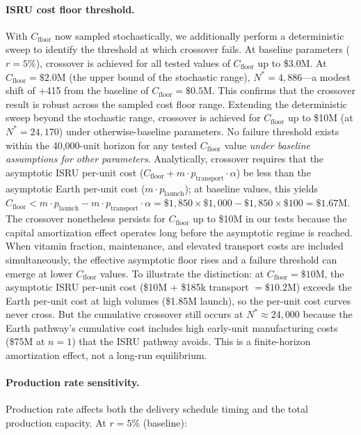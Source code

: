 \documentclass[preprint,12pt]{elsarticle}
\begin{document}
\paragraph{ISRU cost floor threshold.} With $C_{\mathrm{floor}}$ now sampled stochastically, we additionally perform a deterministic sweep to identify the threshold at which crossover fails. At baseline parameters ($r = 5\%$), crossover is achieved for all tested values of $C_{\mathrm{floor}}$ up to \$3.0M. At $C_{\mathrm{floor}} = \$2.0$M (the upper bound of the stochastic range), $N^* = 4{,}886$---a modest shift of $+$415 from the baseline of $C_{\mathrm{floor}} = \$0.5$M. This confirms that the crossover result is robust across the sampled cost floor range. Extending the deterministic sweep beyond the stochastic range, crossover is achieved for $C_{\mathrm{floor}}$ up to \$10M (at $N^* = 24{,}170$) under otherwise-baseline parameters. No failure threshold exists within the 40,000-unit horizon for any tested $C_{\mathrm{floor}}$ value \emph{under baseline assumptions for other parameters}. Analytically, crossover requires that the asymptotic ISRU per-unit cost ($C_{\mathrm{floor}} + m \cdot p_{\mathrm{transport}} \cdot \alpha$) be less than the asymptotic Earth per-unit cost ($m \cdot p_{\mathrm{launch}}$); at baseline values, this yields $C_{\mathrm{floor}} < m \cdot p_{\mathrm{launch}} - m \cdot p_{\mathrm{transport}} \cdot \alpha = \$1{,}850 \times \$1{,}000 - \$1{,}850 \times \$100 = \$1.67$M. The crossover nonetheless persists for $C_{\mathrm{floor}}$ up to \$10M in our tests because the capital amortization effect operates long before the asymptotic regime is reached. When vitamin fraction, maintenance, and elevated transport costs are included simultaneously, the effective asymptotic floor rises and a failure threshold can emerge at lower $C_{\mathrm{floor}}$ values. To illustrate the distinction: at $C_{\mathrm{floor}} = \$10$M, the asymptotic ISRU per-unit cost (\$10M + \$185k transport $= \$10.2$M) exceeds the Earth per-unit cost at high volumes (\$1.85M launch), so the per-unit cost curves never cross. But the cumulative crossover still occurs at $N^* \approx 24{,}000$ because the Earth pathway's cumulative cost includes high early-unit manufacturing costs (\$75M at $n = 1$) that the ISRU pathway avoids. This is a finite-horizon amortization effect, not a long-run equilibrium.

\paragraph{Production rate sensitivity.} Production rate affects both the delivery schedule timing and the total production capacity. At $r = 5\%$ (baseline):
\end{document}
